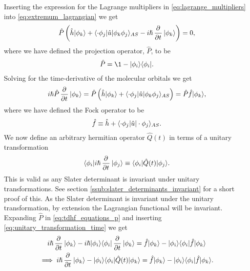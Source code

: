         Inserting the expression for the Lagrange multipliers in
        \autoref{eq:lagrange_multipliers} into \autoref{eq:extremum_lagrangian}
        we get
        \begin{align}
            \hat{P}\para{
                \hat{h}\ket{\phi_k}
                + \bra{\cdot\phi_j}\hat{u}\ket{\phi_k\phi_j}_{AS}
                - i\hslash\dpd{}{t}\ket{\phi_k}
            } = 0,
        \end{align}
        where we have defined the projection operator, $\hat{P}$, to be
        \begin{align}
            \hat{P} = \1 - \ket{\phi_i}\bra{\phi_i}.
        \end{align}
        Solving for the time-derivative of the molecular orbitals we get
        \begin{align}
            i\hslash\hat{P}\dpd{}{t}\ket{\phi_k}
            = \hat{P}\para{
                \hat{h}\ket{\phi_k}
                + \bra{\cdot\phi_j}\hat{u}\ket{\phi_k\phi_j}_{AS}
            }
            = \hat{P}\hat{f}\ket{\phi_k},
            \label{eq:tdhf_equations_p}
        \end{align}
        where we have defined the Fock operator to be
        \begin{align}
            \hat{f}
            \equiv \hat{h} + \langle \cdot\phi_j |\hat{u}| \cdot\phi_j \rangle_{AS}.
        \end{align}
        We now define an arbitrary hermitian operator $\hat{Q}(t)$ in terms of
        a unitary transformation
        \begin{align}
            \bra{\phi_i}i\hslash\dpd{}{t}\ket{\phi_j}
            \equiv \bra{\phi_i}\hat{Q}(t)\ket{\phi_j}.
            \label{eq:unitary_transformation_time}
        \end{align}
        This is valid as any Slater determinant is invariant under unitary
        transformations. See section \ref{ssub:slater_determinants_invariant}
        for a short proof of this. As the Slater determinant is invariant under
        the unitary transformation, by extension the Lagrangian functional will
        be invariant. Expanding $\hat{P}$ in
        \autoref{eq:tdhf_equations_p} and inserting
        \autoref{eq:unitary_transformation_time} we get
        \begin{gather}
            i\hslash\dpd{}{t}\ket{\phi_k}
            - i\hslash\ket{\phi_i}\bra{\phi_i}\dpd{}{t}\ket{\phi_k}
            = \hat{f}\ket{\phi_k}
            - \ket{\phi_i}\bra{\phi_i}\hat{f}\ket{\phi_k}
            \\
            \implies
            i\hslash\dpd{}{t}\ket{\phi_k}
            - \ket{\phi_i}\bra{\phi_i}\hat{Q}(t)\ket{\phi_k}
            = \hat{f}\ket{\phi_k}
            - \ket{\phi_i}\bra{\phi_i}\hat{f}\ket{\phi_k}.
        \end{gather}
